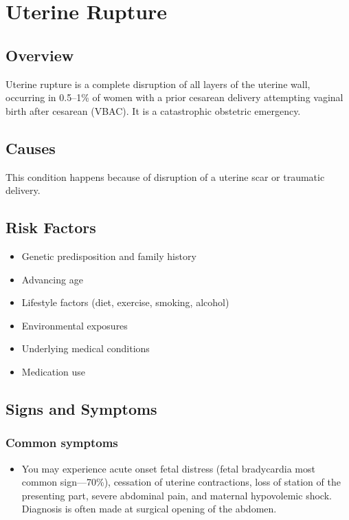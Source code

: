 \chapter{Uterine Rupture}
\label{sec:Uterine Rupture}

\section{Overview}
Uterine rupture is a complete disruption of all layers of the uterine wall, occurring in 0.5--1\% of women with a prior cesarean delivery attempting vaginal birth after cesarean (VBAC). It is a catastrophic obstetric emergency.
\section{Causes}
This condition happens because of disruption of a uterine scar or traumatic delivery.     
\section{Risk Factors}

\begin{itemize}[noitemsep]
  \item Genetic predisposition and family history
  \item Advancing age
  \item Lifestyle factors (diet, exercise, smoking, alcohol)
  \item Environmental exposures
  \item Underlying medical conditions
  \item Medication use
\end{itemize}
\section{Signs and Symptoms}

\subsection{Common symptoms}
\begin{itemize}[noitemsep]
  \item You may experience acute onset fetal distress (fetal bradycardia most common sign---70\%), cessation of uterine contractions, loss of station of the presenting part, severe abdominal pain, and maternal hypovolemic shock. Diagnosis is often made at surgical opening of the abdomen. 
  \end{itemize}

